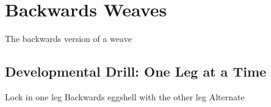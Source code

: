 \section{Backwards Weaves}
\label{sec:sticky/backwards_carves}

The backwards version of a weave 



\subsection*{Developmental Drill: One Leg at a Time}
Lock in one leg
Backwards eggshell with the other leg
Alternate



